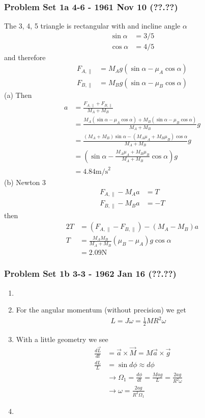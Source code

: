 \documentclass[10pt,a4paper]{book}
\theoremstyle{definition}
\begin{document}
\subsubsection{Problem Set 1a 4-6 - 1961 Nov 10 (??.??)}
The 3, 4, 5 triangle is rectangular with and incline angle $\alpha$
\begin{align}
\sin\alpha&=3/5\\
\cos\alpha&=4/5
\end{align}
and therefore
\begin{align}
F_{A,\parallel}&=M_Ag(\sin\alpha-\mu_A\cos\alpha)\\
F_{B,\parallel}&=M_Bg(\sin\alpha-\mu_B\cos\alpha)
\end{align}
(a) Then
\begin{align}
a
&=\frac{F_{A,\parallel}+F_{B,\parallel}}{M_A+M_B}\\
&=\frac{M_A(\sin\alpha-\mu_A\cos\alpha)+M_B(\sin\alpha-\mu_B\cos\alpha)}{M_A+M_B}g\\
&=\frac{(M_A+M_B)\sin\alpha-(M_A\mu_A+M_B\mu_B)\cos\alpha}{M_A+M_B}g\\
&=\left(\sin\alpha-\frac{M_A\mu_A+M_B\mu_B}{M_A+M_B}\cos\alpha\right)g\\
&=4.84\text{m/s}^2
\end{align}
(b) Newton 3
\begin{align}
F_{A,\parallel}-M_Aa&=T\\
F_{B,\parallel}-M_Ba&=-T
\end{align}
then
\begin{align}
2T
&=(F_{A,\parallel}-F_{B,\parallel})-(M_A-M_B)a\\
T&=\frac{M_AM_B}{M_A+M_B}(\mu_B-\mu_A)g\cos\alpha\\
&=2.09\text{N}
\end{align}


\subsubsection{Problem Set 1b 3-3 - 1962 Jan 16 (??.??)}
\begin{enumerate}
    \item 
    \item For the angular momentum (without precision) we get
    \begin{align}
        L=J\omega=\frac{1}{2}MR^2\omega
    \end{align}
    \item With a little geometry we see
    \begin{align}
        \frac{d\vec{L}}{dt}&=\vec{a}\times\vec{M}=M\vec{a}\times\vec{g}\\
        \frac{dL}{L}&=\sin d\phi\approx d\phi\\
        &\rightarrow\Omega_1=\frac{d\phi}{dt}=\frac{Mag}{L}=\frac{2ag}{R^2\omega}\\
        &\rightarrow\omega=\frac{2ag}{R^2\Omega_1}
    \end{align}
    \item
\end{enumerate}
\end{document}
